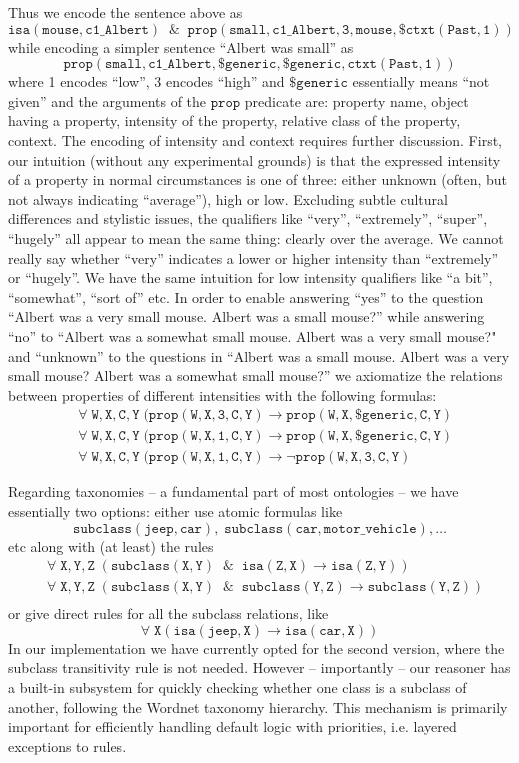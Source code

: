 \documentclass[runningheads]{llncs}
\begin{document}
Thus we encode the sentence above as 
$$\mathtt{isa(mouse,c1\_Albert) \; \; \& \; \; prop(small,c1\_Albert,3,mouse,\$ctxt(Past,1))}$$
while encoding a simpler sentence ``Albert was small'' as
$$\mathtt{prop(small,c1\_Albert,\$generic,\$generic,ctxt(Past,1))}$$
where 1 encodes ``low'',  3 encodes ``high'' and $\mathtt{\$generic}$ essentially means ``not given'' and the arguments of the $\mathtt{prop}$ predicate are: 
property name, object having a property, intensity of the property, relative class of the property, context. 
The encoding of intensity and context requires further discussion. First, our intuition (without any experimental grounds) is that the expressed intensity of a property
in normal circumstances is one of three: either unknown (often, but not always indicating ``average''), high or low. Excluding subtle cultural differences and stylistic issues,
the qualifiers like ``very'', ``extremely'', ``super'', ``hugely'' all appear to mean the same thing: clearly over the average. We cannot really say whether ``very'' indicates
a lower or higher intensity than ``extremely'' or ``hugely''. We have the same intuition for low intensity qualifiers like ``a bit'', ``somewhat'', ``sort of'' etc.
In order to enable answering ``yes'' to the question ``Albert was a very small mouse. Albert was a small mouse?'' while answering ``no'' to 
``Albert was a somewhat small mouse. Albert was a very small mouse?" and
``unknown''  to the questions in ``Albert was a small mouse. Albert was a very small mouse? Albert was a somewhat small mouse?'' we axiomatize the relations
between properties of different intensities with the following formulas:
\begin{align*}
  &\mathtt{\forall \; W, X, C, Y \;(prop(W,X,3,C,Y) \rightarrow prop(W,X,\$generic,C,Y) } \\
  &\mathtt{\forall \; W, X, C, Y \;(prop(W,X,1,C,Y) \rightarrow prop(W,X,\$generic,C,Y) } \\
  &\mathtt{\forall \; W, X, C, Y \;(prop(W,X,1,C,Y) \rightarrow \neg prop(W,X,3,C,Y) }
\end{align*}

Regarding taxonomies -- a fundamental part of most ontologies -- we have essentially two options: either use atomic formulas like 
$$\mathtt{subclass(jeep, car), \;  subclass(car, motor\_vehicle), \ldots}$$ 
etc along with (at least) the rules
\begin{align*}
  &\mathtt{\forall \; X, Y, Z \;(subclass(X,Y) \; \; \& \; \; isa(Z,X) \rightarrow isa(Z,Y))}\\
  &\mathtt{\forall \; X, Y, Z \;(subclass(X,Y) \; \; \& \; \; subclass(Y,Z) \rightarrow subclass(Y,Z))}\\
\end{align*}
or give direct rules for all the subclass relations, like
$$\mathtt{\forall \; X (isa(jeep,X) \rightarrow isa(car,X))}$$
In our implementation we have currently opted for the second version, where the subclass transitivity rule is not needed.
However -- importantly -- our reasoner has a built-in subsystem for
quickly checking whether one class is a subclass of another, following the Wordnet taxonomy hierarchy. This mechanism is primarily important
for efficiently handling default logic with priorities, i.e. layered exceptions to rules. 
\end{document}
